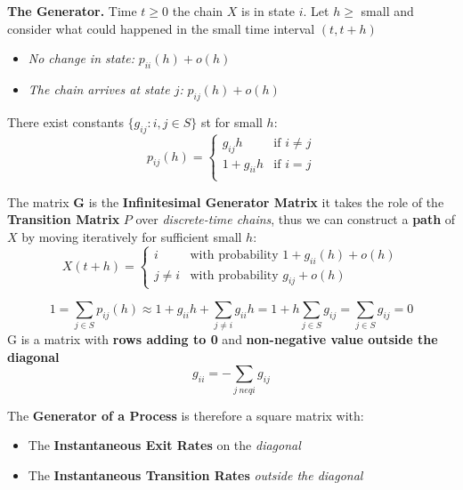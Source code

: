 \begin{tcolorbox}
    \textbf{The Generator.} Time $t \geq 0$ the chain $X$ is in state $i$. Let $h \geq$ small and consider what could happened in the small time interval $(t,t+h)$
    \begin{itemize}
        \item \textit{No change in state:} $p_{ii}(h) + o(h)$
        \item \textit{The chain arrives at state $j$:} $p_{ij}(h) + o(h)$
    \end{itemize}
    There exist constants $\{g_{ij}: i,j \in S\}$ st for small $h$:
    $$
    p_{ij}(h) = \begin{cases}
        g_{ij}h & \mbox{if } i \neq j\\
        1+g_{ii}h & \mbox{if } i = j\\
    \end{cases}$$
\end{tcolorbox}
The matrix \textbf{G} is the \textbf{Infinitesimal Generator Matrix} it takes the role of the \textbf{Transition Matrix} $P$ over \textit{discrete-time chains}, thus we can construct a \textbf{path} of $X$ by moving iteratively  for sufficient small $h$:
$$X(t+h) = 
\begin{cases}
    i & \mbox{with probability } 1 + g_{ii}(h) + o(h)\\
    j \neq i & \mbox{with probability } g_{ij}+ o(h)
\end{cases}$$

$$1 = \sum_{j \in S}p_{ij}(h) \approx 1 + g_{ii}h + \sum_{j \neq i}g_{ii}h = 1 + h \sum_{j \in S}g_{ij} = \sum_{j \in S}g_{ij} = 0$$
G is a matrix with \textbf{rows adding to 0}  and \textbf{non-negative value outside the diagonal}
$$g_{ii} = -\sum_{j\ neq i}g_{ij}$$

\begin{tcolorbox}
The \textbf{Generator of a Process} is therefore a square matrix with:
\begin{itemize}
    \item The \textbf{Instantaneous Exit Rates} on the \textit{diagonal}
    \item The \textbf{Instantaneous Transition Rates} \textit{outside the diagonal}
\end{itemize}    
\end{tcolorbox}

